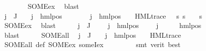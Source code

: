 \begin{isabellebody}
\ \ \ \ \ \ \isamarkupfalse%
\ SOME{\isacharunderscore}{\kern0pt}ex\ \isamarkupfalse%
\ blast\isanewline
\ \ \ \ \isamarkupfalse%
\ {\isachardoublequoteopen}{\isasymforall}j\ {\isasymin}\ J{\isachardot}{\kern0pt}\ {\isasymexists}{\isasymalpha}\ {\isasymphi}{\isachardot}{\kern0pt}\ {\isasymPhi}\ j\ {\isacharequal}{\kern0pt}\ hml{\isacharunderscore}{\kern0pt}pos\ {\isasymalpha}\ {\isasymphi}\ {\isasymand}\ {\isacharparenleft}{\kern0pt}{\isasymexists}{\isasympsi}{\isachardot}{\kern0pt}\ {\isasymexists}{\isasymalpha}\ {\isasymphi}{\isachardot}{\kern0pt}\ {\isasymPhi}\ j\ {\isacharequal}{\kern0pt}\ hml{\isacharunderscore}{\kern0pt}pos\ {\isasymalpha}\ {\isasymphi}\ {\isasymand}\ HML{\isacharunderscore}{\kern0pt}trace\ {\isasympsi}\ {\isasymand}\ {\isacharparenleft}{\kern0pt}{\isasymforall}s{\isachardot}{\kern0pt}\ s\ {\isasymTurnstile}\ {\isasymphi}\ {\isasymlongleftrightarrow}\ s\ {\isasymTurnstile}\ {\isasympsi}{\isacharparenright}{\kern0pt}{\isacharparenright}{\kern0pt}{\isachardoublequoteclose}\isanewline
\ \ \ \ \ \ \isamarkupfalse%
\ SOME{\isacharunderscore}{\kern0pt}ex\ \isamarkupfalse%
\ blast\isanewline
\ \ \ \ \isamarkupfalse%
\ {\isachardoublequoteopen}{\isasymforall}j\ {\isasymin}\ J{\isachardot}{\kern0pt}\ {\isasymforall}{\isasymalpha}\ {\isasymphi}\ {\isasympsi}{\isachardot}{\kern0pt}\ {\isasymPhi}\ j\ {\isacharequal}{\kern0pt}\ hml{\isacharunderscore}{\kern0pt}pos\ {\isasymalpha}\ {\isasymphi}\ {\isasymand}\ {\isasymPhi}\ j\ {\isacharequal}{\kern0pt}\ {\isasympsi}\ {\isasymlongrightarrow}\ {\isasympsi}\ {\isacharequal}{\kern0pt}\ hml{\isacharunderscore}{\kern0pt}pos\ {\isasymalpha}\ {\isasymphi}{\isachardoublequoteclose}\ \isanewline
\ \ \ \ \ \ \isamarkupfalse%
\ blast\isanewline
\ \ \ \ \isamarkupfalse%
\ SOME{\isacharunderscore}{\kern0pt}all\ \isamarkupfalse%
\ {\isachardoublequoteopen}{\isasymforall}j\ {\isasymin}\ J{\isachardot}{\kern0pt}\ {\isasymexists}{\isasymalpha}\ {\isasympsi}{\isachardot}{\kern0pt}\ {\isasymPsi}\ j\ {\isacharequal}{\kern0pt}\ hml{\isacharunderscore}{\kern0pt}pos\ {\isasymalpha}\ {\isasympsi}\ {\isasymand}\ HML{\isacharunderscore}{\kern0pt}trace\ {\isasympsi}{\isachardoublequoteclose}\isanewline
\ \ \ \ \ \ \isamarkupfalse%
\ SOME{\isacharunderscore}{\kern0pt}all\ {\isasymPsi}{\isacharunderscore}{\kern0pt}def\ SOME{\isacharunderscore}{\kern0pt}ex\ someI{\isacharunderscore}{\kern0pt}ex\ \isanewline
\ \ \ \ \ \ \isamarkupfalse%
\ {\isacharparenleft}{\kern0pt}smt\ {\isacharparenleft}{\kern0pt}verit{\isacharcomma}{\kern0pt}\ best{\isacharparenright}{\kern0pt}{\isacharparenright}{\kern0pt}\ \isanewline

\end{isabellebody}
